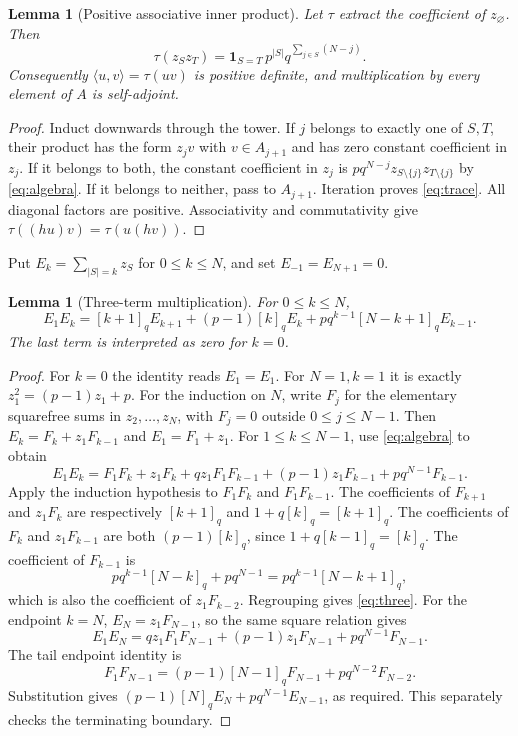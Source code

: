\documentclass[11pt]{article}
\newtheorem{lemma}[theorem]{Lemma}
\begin{document}
\begin{lemma}[Positive associative inner product]\label{lem:trace}
Let $\tau$ extract the coefficient of $z_\varnothing$. Then
\begin{equation}\label{eq:trace}
\tau(z_Sz_T)=\boldsymbol1_{S=T}\,p^{|S|}q^{\sum_{j\in S}(N-j)}.
\end{equation}
Consequently $\langle u,v\rangle=\tau(uv)$ is positive definite, and multiplication by every element of $A$ is self-adjoint.
\end{lemma}
\begin{proof}
Induct downwards through the tower. If $j$ belongs to exactly one of $S,T$, their product has the form $z_jv$ with $v\in A_{j+1}$ and has zero constant coefficient in $z_j$. If it belongs to both, the constant coefficient in $z_j$ is $pq^{N-j}z_{S\setminus\{j\}}z_{T\setminus\{j\}}$ by \eqref{eq:algebra}. If it belongs to neither, pass to $A_{j+1}$. Iteration proves \eqref{eq:trace}. All diagonal factors are positive. Associativity and commutativity give $\tau((hu)v)=\tau(u(hv))$.
\end{proof}

Put $E_k=\sum_{|S|=k}z_S$ for $0\leq k\leq N$, and set $E_{-1}=E_{N+1}=0$.

\begin{lemma}[Three-term multiplication]\label{lem:three}
For $0\leq k\leq N$,
\begin{equation}\label{eq:three}
E_1E_k=[k+1]_qE_{k+1}+(p-1)[k]_qE_k+
pq^{k-1}[N-k+1]_qE_{k-1}.
\end{equation}
The last term is interpreted as zero for $k=0$.
\end{lemma}
\begin{proof}
For $k=0$ the identity reads $E_1=E_1$. For $N=1,k=1$ it is exactly $z_1^2=(p-1)z_1+p$.
For the induction on $N$, write $F_j$ for the elementary squarefree sums in $z_2,\ldots,z_N$, with $F_j=0$ outside $0\leq j\leq N-1$. Then $E_k=F_k+z_1F_{k-1}$ and $E_1=F_1+z_1$. For $1\leq k\leq N-1$, use \eqref{eq:algebra} to obtain
\[
E_1E_k=F_1F_k+z_1F_k+qz_1F_1F_{k-1}
 +(p-1)z_1F_{k-1}+pq^{N-1}F_{k-1}.
\]
Apply the induction hypothesis to $F_1F_k$ and $F_1F_{k-1}$. The coefficients of $F_{k+1}$ and $z_1F_k$ are respectively $[k+1]_q$ and $1+q[k]_q=[k+1]_q$. The coefficients of $F_k$ and $z_1F_{k-1}$ are both $(p-1)[k]_q$, since $1+q[k-1]_q=[k]_q$. The coefficient of $F_{k-1}$ is
\[
pq^{k-1}[N-k]_q+pq^{N-1}=pq^{k-1}[N-k+1]_q,
\]
which is also the coefficient of $z_1F_{k-2}$. Regrouping gives \eqref{eq:three}.
For the endpoint $k=N$, $E_N=z_1F_{N-1}$, so the same square relation gives
\[
E_1E_N=qz_1F_1F_{N-1}+(p-1)z_1F_{N-1}+pq^{N-1}F_{N-1}.
\]
The tail endpoint identity is
\[
F_1F_{N-1}=(p-1)[N-1]_qF_{N-1}+pq^{N-2}F_{N-2}.
\]
Substitution gives $(p-1)[N]_qE_N+pq^{N-1}E_{N-1}$, as required. This separately checks the terminating boundary.
\end{proof}
\end{document}
